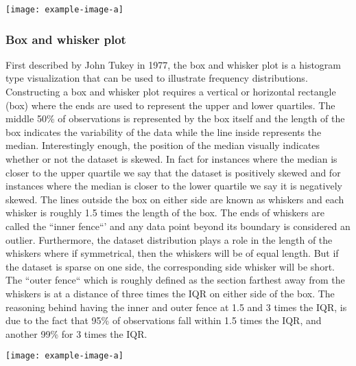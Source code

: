 \texttt{[image: example-image-a]} 

\subsubsection{Box and whisker plot}
First described by John Tukey in 1977, the box and whisker plot is a histogram
type visualization that can be used to illustrate frequency distributions. Constructing
a box and whisker plot requires a vertical or horizontal rectangle (box) where the 
ends are used to represent the upper and lower quartiles. The middle 50\% of observations 
is represented by the box itself and the length of the box indicates the variability 
of the data while the line inside represents the median. Interestingly enough, 
the position of the median visually indicates whether or not the dataset is skewed. 
In fact for instances where the median is closer to the upper quartile we say that 
the dataset is positively skewed and for instances where the median is closer to 
the lower quartile  we say it is negatively skewed. 
The lines outside the box on either side are known as whiskers and each whisker 
is roughly 1.5 times the length of the box. The ends of whiskers are called the 
``inner fence``' and any data point beyond its boundary is considered an outlier. 
Furthermore, the dataset distribution plays a role in the length of the whiskers 
where if symmetrical, then the whiskers will be of equal length. But if the dataset 
is sparse on one side, the corresponding side whisker will be short. The ``outer fence``
which is roughly defined as the section farthest away from the whiskers is at a 
distance of three times the IQR on either side of the box. The reasoning behind 
having the inner and outer fence at 1.5 and 3 times the IQR, is due to the fact 
that 95\% of observations fall within 1.5 times the IQR, and another 99\% for 3 
times the IQR.

\texttt{[image: example-image-a]} 

